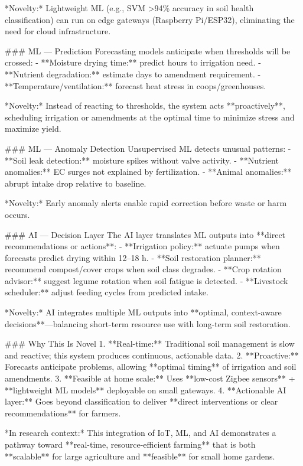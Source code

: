 \documentclass{sigchi}
\begin{document}
*Novelty:* Lightweight ML (e.g., SVM >94\% accuracy in soil health classification) can run on edge gateways (Raspberry Pi/ESP32), eliminating the need for cloud infrastructure.

### ML — Prediction
Forecasting models anticipate when thresholds will be crossed:
- **Moisture drying time:** predict hours to irrigation need.
- **Nutrient degradation:** estimate days to amendment requirement.
- **Temperature/ventilation:** forecast heat stress in coops/greenhouses.

*Novelty:* Instead of reacting to thresholds, the system acts **proactively**, scheduling irrigation or amendments at the optimal time to minimize stress and maximize yield.

### ML — Anomaly Detection
Unsupervised ML detects unusual patterns:
- **Soil leak detection:** moisture spikes without valve activity.
- **Nutrient anomalies:** EC surges not explained by fertilization.
- **Animal anomalies:** abrupt intake drop relative to baseline.

*Novelty:* Early anomaly alerts enable rapid correction before waste or harm occurs.

### AI — Decision Layer
The AI layer translates ML outputs into **direct recommendations or actions**:
- **Irrigation policy:** actuate pumps when forecasts predict drying within 12–18 h.
- **Soil restoration planner:** recommend compost/cover crops when soil class degrades.
- **Crop rotation advisor:** suggest legume rotation when soil fatigue is detected.
- **Livestock scheduler:** adjust feeding cycles from predicted intake.

*Novelty:* AI integrates multiple ML outputs into **optimal, context-aware decisions**—balancing short-term resource use with long-term soil restoration.

### Why This Is Novel
1. **Real-time:** Traditional soil management is slow and reactive; this system produces continuous, actionable data.  
2. **Proactive:** Forecasts anticipate problems, allowing **optimal timing** of irrigation and soil amendments.  
3. **Feasible at home scale:** Uses **low-cost Zigbee sensors** + **lightweight ML models** deployable on small gateways.  
4. **Actionable AI layer:** Goes beyond classification to deliver **direct interventions or clear recommendations** for farmers.  

*In research context:* This integration of IoT, ML, and AI demonstrates a pathway toward **real-time, resource-efficient farming** that is both **scalable** for large agriculture and **feasible** for small home gardens.
\end{document}

